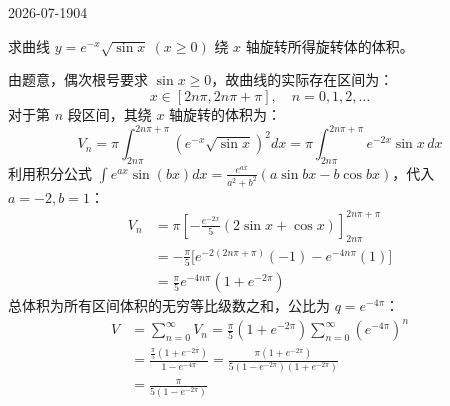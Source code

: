 \begin{mistake}{2026-07-19}{04}

\begin{problemcontent}
求曲线 \(y = e^{-x} \sqrt{\sin x} \ (x \ge 0)\) 绕 \(x\) 轴旋转所得旋转体的体积。
\end{problemcontent}

\begin{solutioncontent}
由题意，偶次根号要求 \(\sin x \ge 0\)，故曲线的实际存在区间为：
\[x \in [2n\pi, 2n\pi + \pi], \quad n = 0, 1, 2, \dots\]
对于第 \(n\) 段区间，其绕 \(x\) 轴旋转的体积为：
\[V_n = \pi \int_{2n\pi}^{2n\pi + \pi} \left( e^{-x} \sqrt{\sin x} \right)^2 dx = \pi \int_{2n\pi}^{2n\pi + \pi} e^{-2x} \sin x \, dx\]
利用积分公式 \(\int e^{ax} \sin(bx) dx = \frac{e^{ax}}{a^2 + b^2} (a \sin bx - b \cos bx)\)，代入 \(a=-2, b=1\)：
\[\begin{aligned}
V_n &= \pi \left[ -\frac{e^{-2x}}{5} (2 \sin x + \cos x) \right]_{2n\pi}^{2n\pi + \pi} \\
&= -\frac{\pi}{5} \Big[ e^{-2(2n\pi+\pi)}(-1) - e^{-4n\pi}(1) \Big] \\
&= \frac{\pi}{5} e^{-4n\pi} (1 + e^{-2\pi})
\end{aligned}\]
总体积为所有区间体积的无穷等比级数之和，公比为 \(q = e^{-4\pi}\)：
\[\begin{aligned}
V &= \sum_{n=0}^{\infty} V_n = \frac{\pi}{5} (1 + e^{-2\pi}) \sum_{n=0}^{\infty} (e^{-4\pi})^n \\
&= \frac{\frac{\pi}{5} (1 + e^{-2\pi})}{1 - e^{-4\pi}} = \frac{\pi (1 + e^{-2\pi})}{5(1 - e^{-2\pi})(1 + e^{-2\pi})} \\
&= \frac{\pi}{5(1 - e^{-2\pi})}
\end{aligned}\]
\end{solutioncontent}


\end{mistake}
